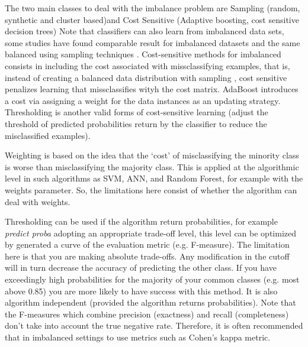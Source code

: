\documentclass[11pt]{article}
\begin{document}
The two main classes to deal with the imbalance problem are Sampling (random, synthetic and cluster based)and Cost Sensitive (Adaptive boosting, cost sensitive decision trees) 
Note that classifiers can also learn from imbalanced data sets, some studies have found comparable result for imbalanced datasets and the same balanced using sampling techniques \cite{japkowicz2002class}.
Cost-sensitive methods for imbalanced consists in including the cost associated with missclassifying examples, that is, instead of creating a balanced data distribution with sampling , cost sensitive penalizes learning that missclassifies wityh the cost matrix. AdaBoost introduces a cost via assigning a weight for the data instances as an updating strategy. Thresholding is another valid forms of cost-sensitive learning (adjust the threshold of predicted probabilities return by the classifier to reduce the misclassified examples).

Weighting is based on the idea that the ‘cost’ of misclassifying the minority class is worse than misclassifying the majority  class. This is applied at the algorithmic level in such algorithms as SVM, ANN, and Random Forest, for example with the weights parameter. So, the limitations here consist of whether the algorithm can deal with weights.


Thresholding can be used if the algorithm return probabilities, for example \textit{predict proba} adopting an appropriate trade-off level, this level can be optimized by generated a curve of the evaluation metric (e.g. F-measure). The limitation here is that you are making absolute trade-offs. Any modification in the cutoff will in turn decrease the accuracy of predicting the other class. If you have exceedingly high probabilities for the majority of your common classes (e.g. most above 0.85) you are more likely to have success with this method. It is also algorithm independent (provided the algorithm returns probabilities).
Note that the F-measures which combine precision (exactness) and recall (completeness) don’t take into account the true negative rate. Therefore, it is often recommended that in imbalanced settings to use metrics such as Cohen’s kappa metric.
\end{document}
